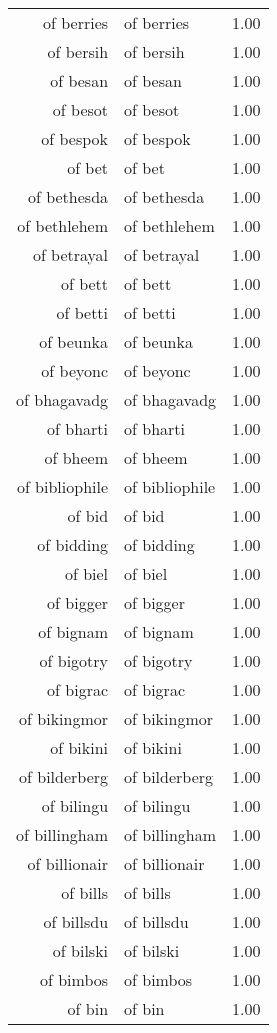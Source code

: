 \begin{table}[ht]
\begin{tabular}{rlr}
  of berries & of berries & 1.00 \\ 
  of bersih & of bersih & 1.00 \\ 
  of besan & of besan & 1.00 \\ 
  of besot & of besot & 1.00 \\ 
  of bespok & of bespok & 1.00 \\ 
  of bet & of bet & 1.00 \\ 
  of bethesda & of bethesda & 1.00 \\ 
  of bethlehem & of bethlehem & 1.00 \\ 
  of betrayal & of betrayal & 1.00 \\ 
  of bett & of bett & 1.00 \\ 
  of betti & of betti & 1.00 \\ 
  of beunka & of beunka & 1.00 \\ 
  of beyonc & of beyonc & 1.00 \\ 
  of bhagavadg & of bhagavadg & 1.00 \\ 
  of bharti & of bharti & 1.00 \\ 
  of bheem & of bheem & 1.00 \\ 
  of bibliophile & of bibliophile & 1.00 \\ 
  of bid & of bid & 1.00 \\ 
  of bidding & of bidding & 1.00 \\ 
  of biel & of biel & 1.00 \\ 
  of bigger & of bigger & 1.00 \\ 
  of bignam & of bignam & 1.00 \\ 
  of bigotry & of bigotry & 1.00 \\ 
  of bigrac & of bigrac & 1.00 \\ 
  of bikingmor & of bikingmor & 1.00 \\ 
  of bikini & of bikini & 1.00 \\ 
  of bilderberg & of bilderberg & 1.00 \\ 
  of bilingu & of bilingu & 1.00 \\ 
  of billingham & of billingham & 1.00 \\ 
  of billionair & of billionair & 1.00 \\ 
  of bills & of bills & 1.00 \\ 
  of billsdu & of billsdu & 1.00 \\ 
  of bilski & of bilski & 1.00 \\ 
  of bimbos & of bimbos & 1.00 \\ 
  of bin & of bin & 1.00 \\ 

\end{tabular}
\end{table}
